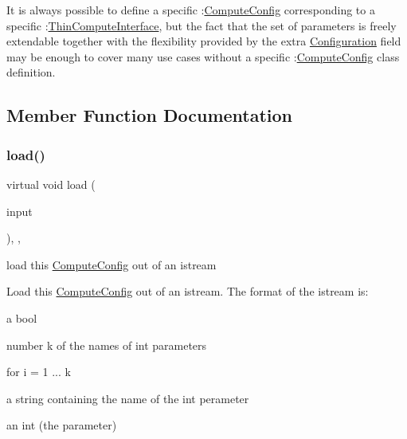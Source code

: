 It is always possible to define a specific \+:\mbox{\hyperlink{class_s_m_spp__di__unipi__it_1_1_compute_config}{Compute\+Config}} corresponding to a specific \+:\mbox{\hyperlink{class_s_m_spp__di__unipi__it_1_1_thin_compute_interface}{Thin\+Compute\+Interface}}, but the fact that the set of parameters is freely extendable together with the flexibility provided by the extra \mbox{\hyperlink{class_s_m_spp__di__unipi__it_1_1_configuration}{Configuration}} field may be enough to cover many use cases without a specific \+:\mbox{\hyperlink{class_s_m_spp__di__unipi__it_1_1_compute_config}{Compute\+Config}} class definition. 

\subsection{Member Function Documentation}
\mbox{\label{class_s_m_spp__di__unipi__it_1_1_compute_config_a019850055afe817b816bae5699f461d3}} 
\subsubsection{\texorpdfstring{load()}{load()}}
{\footnotesize\ttfamily virtual void load (\begin{DoxyParamCaption}\item[{std\+::istream \&}]{input }\end{DoxyParamCaption})\hspace{0.3cm}{\ttfamily [override]}, {\ttfamily [protected]}, {\ttfamily [virtual]}}



load this \mbox{\hyperlink{class_s_m_spp__di__unipi__it_1_1_compute_config}{Compute\+Config}} out of an istream 

Load this \mbox{\hyperlink{class_s_m_spp__di__unipi__it_1_1_compute_config}{Compute\+Config}} out of an istream. The format of the istream is\+:

a bool

number k of the names of int parameters

for i = 1 ... k
\begin{DoxyItemize}
\item a string containing the name of the int perameter
\item an int (the parameter)
\end{DoxyItemize}

